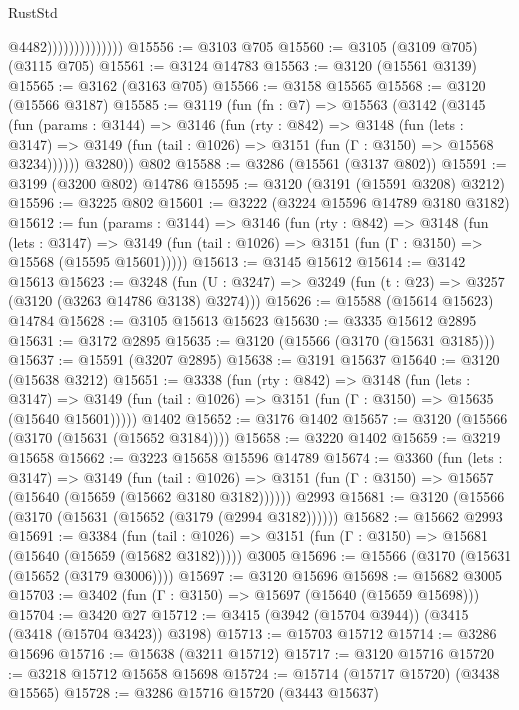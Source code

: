 \begin{lexlean}{RustStd}
\begin{coremodule}
{\begin{coremodule}
{{{{{{{{{{{{{{{{{{{{{{{{{{                                @4482))))))))))))))
@15556 := @3103 @705
@15560 := @3105 (@3109 @705) (@3115 @705)
@15561 := @3124 @14783
@15563 := @3120 (@15561 @3139)
@15565 := @3162 (@3163 @705)
@15566 := @3158 @15565
@15568 := @3120 (@15566 @3187)
@15585 := @3119
    (fun (fn : @7) =>
    @15563
      (@3142
        (@3145
          (fun (params : @3144) =>
          @3146
            (fun (rty : @842) =>
            @3148
              (fun (lets : @3147) =>
              @3149 (fun (tail : @1026) => @3151 (fun (Γ : @3150) => @15568 @3234))))))
        @3280))
    @802
@15588 := @3286 (@15561 (@3137 @802))
@15591 := @3199 (@3200 @802) @14786
@15595 := @3120 (@3191 (@15591 @3208) @3212)
@15596 := @3225 @802
@15601 := @3222 (@3224 @15596 @14789 @3180 @3182)
@15612 := fun (params : @3144) =>
  @3146
    (fun (rty : @842) =>
    @3148
      (fun (lets : @3147) =>
      @3149 (fun (tail : @1026) => @3151 (fun (Γ : @3150) => @15568 (@15595 @15601)))))
@15613 := @3145 @15612
@15614 := @3142 @15613
@15623 := @3248
    (fun (U : @3247) => @3249 (fun (t : @23) => @3257 (@3120 (@3263 @14786 @3138) @3274)))
@15626 := @15588 (@15614 @15623) @14784
@15628 := @3105 @15613 @15623
@15630 := @3335 @15612 @2895
@15631 := @3172 @2895
@15635 := @3120 (@15566 (@3170 (@15631 @3185)))
@15637 := @15591 (@3207 @2895)
@15638 := @3191 @15637
@15640 := @3120 (@15638 @3212)
@15651 := @3338
    (fun (rty : @842) =>
    @3148
      (fun (lets : @3147) =>
      @3149 (fun (tail : @1026) => @3151 (fun (Γ : @3150) => @15635 (@15640 @15601)))))
    @1402
@15652 := @3176 @1402
@15657 := @3120 (@15566 (@3170 (@15631 (@15652 @3184))))
@15658 := @3220 @1402
@15659 := @3219 @15658
@15662 := @3223 @15658 @15596 @14789
@15674 := @3360
    (fun (lets : @3147) =>
    @3149
      (fun (tail : @1026) =>
      @3151 (fun (Γ : @3150) => @15657 (@15640 (@15659 (@15662 @3180 @3182))))))
    @2993
@15681 := @3120 (@15566 (@3170 (@15631 (@15652 (@3179 (@2994 @3182))))))
@15682 := @15662 @2993
@15691 := @3384
    (fun (tail : @1026) => @3151 (fun (Γ : @3150) => @15681 (@15640 (@15659 (@15682 @3182)))))
    @3005
@15696 := @15566 (@3170 (@15631 (@15652 (@3179 @3006))))
@15697 := @3120 @15696
@15698 := @15682 @3005
@15703 := @3402 (fun (Γ : @3150) => @15697 (@15640 (@15659 @15698)))
@15704 := @3420 @27
@15712 := @3415 (@3942 (@15704 @3944)) (@3415 (@3418 (@15704 @3423)) @3198)
@15713 := @15703 @15712
@15714 := @3286 @15696
@15716 := @15638 (@3211 @15712)
@15717 := @3120 @15716
@15720 := @3218 @15712 @15658 @15698
@15724 := @15714 (@15717 @15720) (@3438 @15565)
@15728 := @3286 @15716 @15720 (@3443 @15637)
}}}}}}}}}}}}}}}}}}}}}}}}}}
\end{coremodule}}
\end{coremodule}
\end{lexlean}
